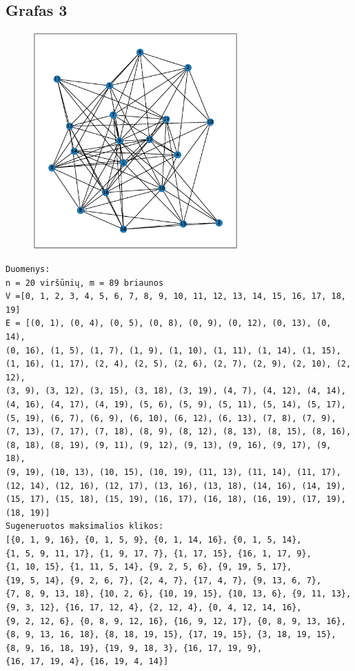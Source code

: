 \documentclass{VUMIFInfKursinis}
\begin{document}
\subsection{Grafas 3}
\begin{figure}[H]
  \includegraphics[height=0.7\textwidth,width=0.7\textwidth]{img/graph_3.eps}
\end{figure}

\begin{verbatim}
Duomenys:
n = 20 viršūnių, m = 89 briaunos
V =[0, 1, 2, 3, 4, 5, 6, 7, 8, 9, 10, 11, 12, 13, 14, 15, 16, 17, 18, 19]
E = [(0, 1), (0, 4), (0, 5), (0, 8), (0, 9), (0, 12), (0, 13), (0, 14),
(0, 16), (1, 5), (1, 7), (1, 9), (1, 10), (1, 11), (1, 14), (1, 15),
(1, 16), (1, 17), (2, 4), (2, 5), (2, 6), (2, 7), (2, 9), (2, 10), (2, 12),
(3, 9), (3, 12), (3, 15), (3, 18), (3, 19), (4, 7), (4, 12), (4, 14),
(4, 16), (4, 17), (4, 19), (5, 6), (5, 9), (5, 11), (5, 14), (5, 17),
(5, 19), (6, 7), (6, 9), (6, 10), (6, 12), (6, 13), (7, 8), (7, 9),
(7, 13), (7, 17), (7, 18), (8, 9), (8, 12), (8, 13), (8, 15), (8, 16),
(8, 18), (8, 19), (9, 11), (9, 12), (9, 13), (9, 16), (9, 17), (9, 18),
(9, 19), (10, 13), (10, 15), (10, 19), (11, 13), (11, 14), (11, 17),
(12, 14), (12, 16), (12, 17), (13, 16), (13, 18), (14, 16), (14, 19), 
(15, 17), (15, 18), (15, 19), (16, 17), (16, 18), (16, 19), (17, 19), (18, 19)]
Sugeneruotos maksimalios klikos:
[{0, 1, 9, 16}, {0, 1, 5, 9}, {0, 1, 14, 16}, {0, 1, 5, 14}, 
{1, 5, 9, 11, 17}, {1, 9, 17, 7}, {1, 17, 15}, {16, 1, 17, 9}, 
{1, 10, 15}, {1, 11, 5, 14}, {9, 2, 5, 6}, {9, 19, 5, 17}, 
{19, 5, 14}, {9, 2, 6, 7}, {2, 4, 7}, {17, 4, 7}, {9, 13, 6, 7}, 
{7, 8, 9, 13, 18}, {10, 2, 6}, {10, 19, 15}, {10, 13, 6}, {9, 11, 13}, 
{9, 3, 12}, {16, 17, 12, 4}, {2, 12, 4}, {0, 4, 12, 14, 16}, 
{9, 2, 12, 6}, {0, 8, 9, 12, 16}, {16, 9, 12, 17}, {0, 8, 9, 13, 16}, 
{8, 9, 13, 16, 18}, {8, 18, 19, 15}, {17, 19, 15}, {3, 18, 19, 15}, 
{8, 9, 16, 18, 19}, {19, 9, 18, 3}, {16, 17, 19, 9}, 
{16, 17, 19, 4}, {16, 19, 4, 14}]
\end{verbatim}
\end{document}
